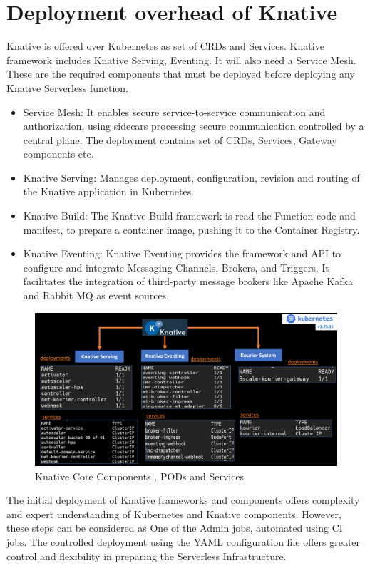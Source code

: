 \documentclass{article}
\begin{document}
\section{Deployment overhead of Knative}
\begin{flushleft}
Knative is offered over Kubernetes as set of CRDs and Services. Knative framework includes Knative Serving, Eventing. It will also need a Service Mesh. 
These are the required components that must be deployed before deploying any Knative Serverless function.
\begin{itemize}
    \item Service Mesh: It enables secure service-to-service communication and authorization, using sidecars processing secure communication controlled by a central plane. 
The deployment contains set of CRDs, Services, Gateway components etc.
    \item Knative Serving:  Manages deployment, configuration, revision and routing of the Knative application in Kubernetes.
    \item Knative Build: The Knative Build framework is read the Function code and manifest, to prepare a container image, pushing it to the Container Registry.
    \item Knative Eventing: Knative Eventing provides the framework and API to configure and integrate Messaging Channels, Brokers, and Triggers. It facilitates the integration of third-party message brokers like Apache Kafka and Rabbit MQ as event sources.
\end{itemize}
\break
\begin{figure}[h]
    \centering
    \includegraphics[width=1.00\linewidth]{images/KnativeAllServieces.png}
    \caption{Knative Core Components , PODs and Services}
\end{figure}

\par
The initial deployment of Knative frameworks and components offers complexity and expert understanding of Kubernetes and Knative components. However, these steps can be considered as One of the Admin jobs, automated using CI jobs. The controlled deployment using the YAML configuration file offers greater control and flexibility in preparing the Serverless Infrastructure.


\end{flushleft}
\end{document}
